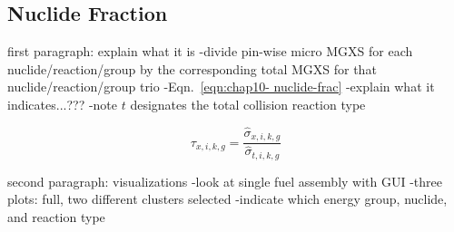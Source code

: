 \clearpage

\subsection{Nuclide Fraction}
\label{subsec:chap10-nuclide-frac}

first paragraph: explain what it is
-divide pin-wise micro \ac{MGXS} for each nuclide/reaction/group by the corresponding total \ac{MGXS} for that nuclide/reaction/group trio
-Eqn.~\ref{eqn:chap10- nuclide-frac}
-explain what it indicates...???
-note $t$ designates the total collision reaction type

\begin{equation}
\label{eqn:chap10-nuclide-frac}
\tau_{x,i,k,g} = \frac{\hat{\sigma}_{x,i,k,g}}{\hat{\sigma}_{t,i,k,g}}
\end{equation}

second paragraph: visualizations
-look at single fuel assembly with GUI
-three plots: full, two different clusters selected
-indicate which energy group, nuclide, and reaction type

